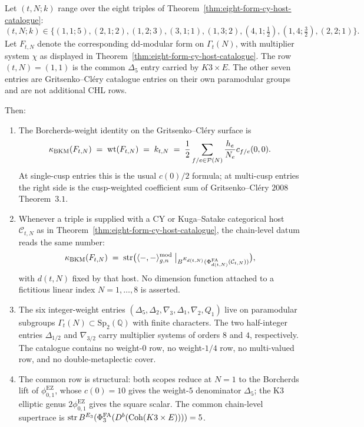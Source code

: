 \begin{theorem}
\label{thm:bl-8form-deployment}
Let $(t, N; k)$ range over the eight triples of
Theorem~\ref{thm:eight-form-cy-host-catalogue}:
\[
 (t, N; k) \in
 \bigl\{(1,1;5), (2,1;2), (1,2;3), (3,1;1), (1,3;2),
 (4,1;\tfrac{1}{2}), (1,4;\tfrac{3}{2}), (2,2;1)\bigr\}.
\]
Let $F_{t,N}$ denote the corresponding dd-modular form on
$\Gamma_t(N)$, with multiplier system $\chi$ as displayed in
Theorem~\ref{thm:eight-form-cy-host-catalogue}. The row
$(t,N)=(1,1)$ is the common $\Delta_5$ entry carried by $K3 \times E$.
The other seven entries are Gritsenko--Cl\'ery catalogue entries on
their own paramodular groups and are not additional CHL rows.

Then:
\begin{enumerate}[label=\textup{(\roman*)}]
 \item The Borcherds-weight identity on the Gritsenko--Cl\'ery surface is
 \[
 \kappa_{\mathrm{BKM}}(F_{t,N}) \;=\; \mathrm{wt}(F_{t,N}) \;=\; k_{t,N}
 \;=\; \frac{1}{2}\sum_{f/e \in \mathcal{P}(N)}
 \frac{h_e}{N_e} c_{f/e}(0,0).
 \]
 At single-cusp entries this is the usual $c(0)/2$ formula; at
 multi-cusp entries the right side is the cusp-weighted coefficient sum
 of Gritsenko--Cl\'ery $2008$ Theorem~$3.1$.
 \item Whenever a triple is supplied with a CY or Kuga--Satake categorical
 host $\mathcal{C}_{t,N}$ as in
 Theorem~\ref{thm:eight-form-cy-host-catalogue}, the chain-level datum
 reads the same number:
 \[
 \kappa_{\mathrm{BKM}}(F_{t,N}) \;=\;
 \mathrm{str}\bigl(
 \langle -, - \rangle^{\mathrm{mod}}_{g, n}
 \bigm|_{B^{E_{d(t,N)}}(\Phi^{\mathrm{FA}}_{d(t,N)}(\mathcal{C}_{t,N}))}
 \bigr),
 \]
 with $d(t,N)$ fixed by that host. No dimension function attached to a
 fictitious linear index $N = 1,\ldots,8$ is asserted.
 \item The six integer-weight entries
 $(\Delta_5,\Delta_2,\nabla_3,\Delta_1,\nabla_2,Q_1)$ live on
 paramodular subgroups $\Gamma_t(N) \subset \mathrm{Sp}_2(\mathbb{Q})$
 with finite characters. The two half-integer entries
 $\Delta_{1/2}$ and $\nabla_{3/2}$ carry multiplier systems of orders
 $8$ and $4$, respectively. The catalogue contains no weight-$0$ row,
 no weight-$1/4$ row, no multi-valued row, and no double-metaplectic
 cover.
 \item The common row is structural:
 both scopes reduce at \(N=1\) to the Borcherds lift of
 \(\phi_{0,1}^{\mathrm{EZ}}\), whose \(c(0)=10\) gives the
 weight-\(5\) denominator \(\Delta_5\); the K3 elliptic genus
 \(2\phi_{0,1}^{\mathrm{EZ}}\) gives the square scalar. The common
 chain-level supertrace is
 $\mathrm{str}\,B^{E_{3}}(\Phi^{\mathrm{FA}}_{3}(D^b(\mathrm{Coh}(K3 \times E)))) = 5$.
\end{enumerate}
\end{theorem}

